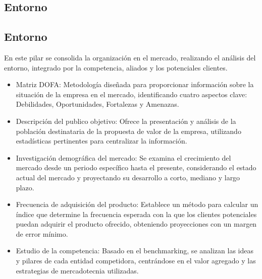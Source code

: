 
{
    \color{orange}   \subsection{Entorno}
}
{\color{blue}\subsection{Entorno}


En este pilar se consolida la organización en el mercado, realizando el análisis del entorno, integrado por la competencia, aliados y los potenciales clientes.

\begin{itemize}
    \item Matriz DOFA: Metodología diseñada para proporcionar información sobre la situación de la empresa en el mercado, identificando cuatro aspectos clave: Debilidades, Oportunidades, Fortalezas y Amenazas.
    \item Descripción del publico objetivo: Ofrece la presentación y análisis de la población destinataria de la propuesta de valor de la empresa, utilizando estadísticas pertinentes para centralizar la información.
    \item Investigación demográfica del mercado: Se examina el crecimiento del mercado desde un periodo específico hasta el presente, considerando el estado actual del mercado y proyectando su desarrollo a corto, mediano y largo plazo.
    \item Frecuencia de adquisición del producto: Establece un método para calcular un índice que determine la frecuencia esperada con la que los clientes potenciales puedan adquirir el producto ofrecido, obteniendo proyecciones con un margen de error mínimo.
    \item Estudio de la competencia: Basado en el benchmarking, se analizan las ideas y pilares de cada entidad competidora, centrándose en el valor agregado y las estrategias de mercadotecnia utilizadas.
\end{itemize}
}